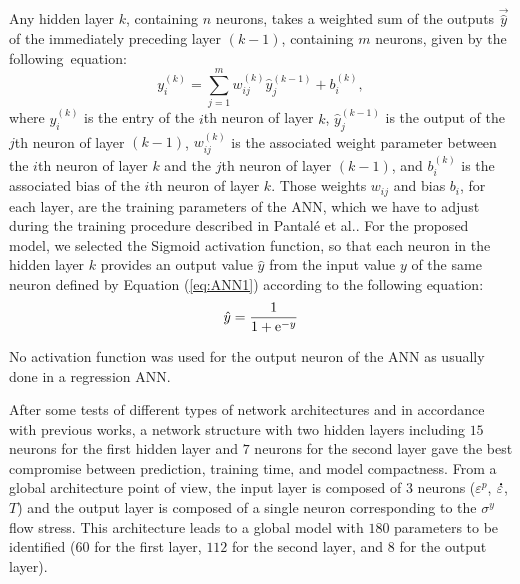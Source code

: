 \documentclass[metals,article,accept,pdftex,moreauthors]{Definitions/mdpi}
\makeatletter
\DeclareRobustCommand{\e}[1]{{\rm e}^{#1}}
\DeclareRobustCommand{\lay}[1]{^{(#1)}}
\DeclareRobustCommand{\mdot}[1]{\accentset{\mbox{\bfseries .}}{#1}}
\DeclareRobustCommand{\eal}{et al.\@\xspace}
\makeatother
\begin{document}
Any hidden layer $k$, containing $n$ neurons, takes a weighted sum of the outputs $\overrightarrow{\hat{y}}$ of the immediately preceding layer $(k-1)$, containing $m$ neurons, given by the following~equation:
\begin{equation}
y_i\lay{k} = \sum_{j=1}^m w_{ij}\lay{k} \hat{y}_j^{(k-1)}+ b_i\lay{k},\label{eq:ANN1}
\end{equation}
where $y_i\lay{k}$ is the entry of the  $i$th neuron of layer $k$, $\hat{y}_j\lay{k-1}$ is the output of the $j$th neuron of layer $(k-1)$, $w_{ij}\lay{k}$ is the associated weight parameter between the  $i$th neuron of layer $k$ and the  $j$th neuron of layer $(k-1)$, and $b_i\lay{k}$ is the associated bias of the  $i$th neuron of layer $k$.
Those weights $w_{ij}$ and bias $b_i$, for each layer, are the training parameters of the ANN, which we have to adjust during the training procedure described in Pantalé \eal \cite{Pantale-2021, Pantale-2023}.
For the proposed model, we selected the Sigmoid activation function, so that each neuron in the hidden layer $k$ provides an output value ${\hat{y}}$ from the input value $y$ of the same neuron defined by Equation (\ref{eq:ANN1}) according to the following equation:
\begin{equation}
\hat{y}=\frac{1}{1 + \e{-y}}\label{eq:ANN2}
\end{equation}

No activation function was used for the output neuron of the ANN as usually done in a regression ANN.

After some tests of different types of network architectures and in accordance with previous works, a network structure with two hidden layers including $15$ neurons for the first hidden layer and $7$ neurons for the second layer gave the best compromise between prediction, training time, and model compactness.
From a global architecture point of view, the input layer is composed of $3$ neurons ($\varepsilon^p$, $\mdot\varepsilon$, $T$) and the output layer is composed of a single neuron corresponding to the $\sigma^y$ flow stress.
This architecture leads to a global model with $180$ parameters to be identified ($60$ for the first layer, $112$ for the second layer, and $8$ for the output layer).
\end{document}
